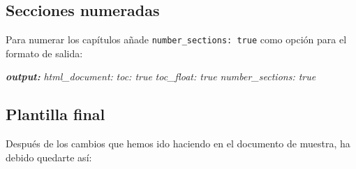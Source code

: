 \documentclass[
  degree=mecinf,
  title=normal,
  toc=normal,
  bib=normal]{mnye}
\newenvironment{Shaded}{\begin{snugshade}}{\end{snugshade}}
\newcommand{\AnnotationTok}[1]{\textcolor[rgb]{0.56,0.35,0.01}{\textbf{\textit{#1}}}}
\newcommand{\CommentTok}[1]{\textcolor[rgb]{0.56,0.35,0.01}{\textit{#1}}}
\newcommand{\FunctionTok}[1]{\textcolor[rgb]{0.00,0.00,0.00}{#1}}
\newcommand{\InformationTok}[1]{\textcolor[rgb]{0.56,0.35,0.01}{\textbf{\textit{#1}}}}
\begin{document}
\hypertarget{secciones-numeradas}{%
\subsection{Secciones numeradas}\label{secciones-numeradas}}

Para numerar los capítulos añade \texttt{number\_sections:\ true} como opción para el formato de salida:

\begin{Shaded}
\begin{Highlighting}[]
\AnnotationTok{output:}\CommentTok{ }
\CommentTok{    html\_document:}
\CommentTok{        toc: true}
\CommentTok{        toc\_float: true}
\CommentTok{        number\_sections: true}
\end{Highlighting}
\end{Shaded}

\hypertarget{plantilla-final}{%
\subsection{Plantilla final}\label{plantilla-final}}

Después de los cambios que hemos ido haciendo en el documento de muestra, ha debido quedarte así:

\begin{Shaded}
\end{Shaded}
\end{document}
